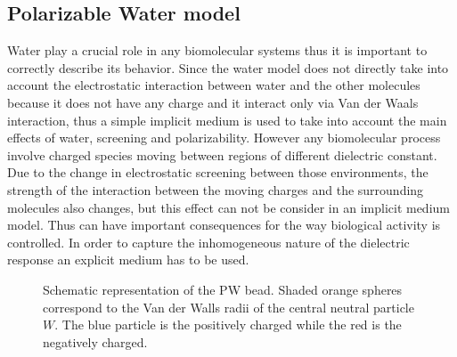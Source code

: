 \subsection{Polarizable Water model}
\label{sec:pw}
Water play a crucial role in any biomolecular systems thus it is important to correctly describe its behavior. 
Since the \martini water model does not directly take into account the electrostatic interaction between water and the other molecules because it does not have any charge and it interact only via Van der Waals interaction, thus a simple implicit medium is used to take into account the main effects of water, screening and polarizability. However any biomolecular process involve charged species moving between regions of different dielectric constant. Due to the change in electrostatic screening between those environments, the strength of the interaction between the moving charges and the surrounding molecules also changes, but this effect can not be consider in an implicit medium model. Thus can have important consequences for the way biological activity is controlled. In order to capture the inhomogeneous nature of the dielectric response an explicit medium has to be used. 
\begin{figure}[!ht]
	\center
	\caption{Schematic representation of the \acs{PW} bead. Shaded orange spheres correspond to the Van der Walls radii of the central neutral particle $W$. The blue particle is the positively charged while the red is the negatively charged.}
	\label{fig:PW}
\end{figure}

